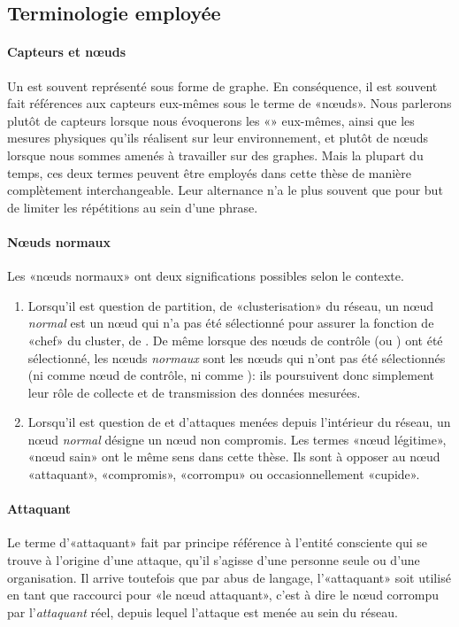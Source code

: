     \subsection{Terminologie employée}
            \paragraph{Capteurs et nœuds}
Un \rcsf est souvent représenté sous forme de graphe.
En conséquence, il est souvent fait références aux capteurs eux-mêmes sous le terme de «nœuds».
Nous parlerons plutôt de capteurs lorsque nous évoquerons les «\rcs» eux-mêmes, ainsi que les mesures physiques qu'ils réalisent sur leur environnement, et plutôt de nœuds lorsque nous sommes amenés à travailler sur des graphes.
Mais la plupart du temps, ces deux termes peuvent être employés dans cette thèse de manière complètement interchangeable.
Leur alternance n'a le plus souvent que pour but de limiter les répétitions au sein d'une phrase.

            \paragraph{Nœuds normaux}
Les «nœuds normaux» ont deux significations possibles selon le contexte.
\begin{enumerate}
    \item Lorsqu'il est question de partition, de «clusterisation» du réseau, un nœud \textit{normal} est un nœud qui n'a pas été sélectionné pour assurer la fonction de «chef» du cluster, de \ch. De même lorsque des nœuds de contrôle (\cns ou \vns) ont été sélectionné, les nœuds \textit{normaux} sont les nœuds qui n'ont pas été sélectionnés (ni comme nœud de contrôle, ni comme \ch): ils poursuivent donc simplement leur rôle de collecte et de transmission des données mesurées.
    \item Lorsqu'il est question de \secu et d'attaques menées depuis l'intérieur du réseau, un nœud \textit{normal} désigne un nœud non compromis. Les termes «nœud légitime», «nœud sain» ont le même sens dans cette thèse. Ils sont à opposer au nœud «attaquant», «compromis», «corrompu» ou occasionnellement «cupide».
\end{enumerate}

            \paragraph{Attaquant}
Le terme d'«attaquant» fait par principe référence à l'entité consciente qui se trouve à l'origine d'une attaque, qu'il s'agisse d'une personne seule ou d'une organisation.
Il arrive toutefois que par abus de langage, l'«attaquant» soit utilisé en tant que raccourci pour «le nœud attaquant», c'est à dire le nœud corrompu par l'\textit{attaquant} réel, depuis lequel l'attaque est menée au sein du réseau.

